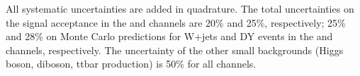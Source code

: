 \noindent All systematic uncertainties are added in quadrature. The total uncertainties on the signal acceptance in the \leptonTau and \tauTau 
channels are 20\% and 25\%, respectively; 25\% and 28\% on Monte Carlo predictions for W+jets and DY events in the \leptonTau and \tauTau  channels, respectively.
The uncertainty of the other small backgrounds (Higgs boson, diboson, ttbar production) is 50\% for all channels.


